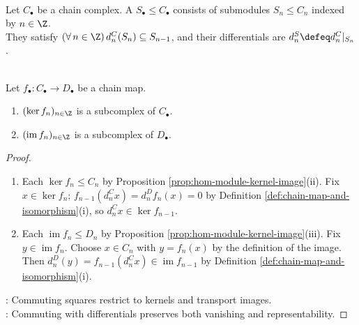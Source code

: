 \begin{definition} \label{def:chain-subcomplex} \\
Let $C_\bullet$ be a chain complex. A  $S_\bullet\leq C_\bullet$ consists of submodules $S_n\leq C_n$ indexed by $n\in\Z$.\\
They satisfy $(\forall\,n\in\Z)\,d^C_n(S_n)\subseteq S_{n-1}$, and their differentials are $d^S_n\defeq d^C_n|_{S_n}$.
\end{definition}

\begin{proposition} \label{prop:chain-map-kernel-image-subcomplexes} \\
Let $f_\bullet:C_\bullet\to D_\bullet$ be a chain map.
\begin{enumerate}[label=(\roman*)]
\setlength{\itemsep}{0pt}
\item $(\ker f_n)_{n\in\Z}$ is a subcomplex of $C_\bullet$.
\item $(\operatorname{im}f_n)_{n\in\Z}$ is a subcomplex of $D_\bullet$.
\end{enumerate}
\begin{proof}
\begin{enumerate}[label=(\roman*)]
\setlength{\itemsep}{0pt}
\item Each $\ker f_n\leq C_n$ by Proposition \ref{prop:hom-module-kernel-image}(ii). Fix $x\in\ker f_n$; $f_{n-1}(d^C_nx)=d^D_nf_n(x)=0$ by Definition \ref{def:chain-map-and-isomorphism}(i), so $d^C_nx\in\ker f_{n-1}$.
\item Each $\operatorname{im}f_n\leq D_n$ by Proposition \ref{prop:hom-module-kernel-image}(iii). Fix $y\in\operatorname{im}f_n$. Choose $x\in C_n$ with $y=f_n(x)$ by the definition of the image.\\
Then $d^D_n(y)=f_{n-1}(d^C_nx)\in\operatorname{im}f_{n-1}$ by Definition \ref{def:chain-map-and-isomorphism}(i).
\end{enumerate}
: Commuting squares restrict to kernels and transport images.\\
: Commuting with differentials preserves both vanishing and representability.
\end{proof}
\end{proposition}

